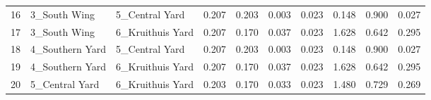 \begin{tabular}{lllrrrrrrr}
16 &     3\_South Wing &    5\_Central Yard &    0.207 &    0.203 &  0.003 &  0.023 &  0.148 &    0.900 &   0.027 \\
17 &     3\_South Wing &  6\_Kruithuis Yard &    0.207 &    0.170 &  0.037 &  0.023 &  1.628 &    0.642 &   0.295 \\
18 &  4\_Southern Yard &    5\_Central Yard &    0.207 &    0.203 &  0.003 &  0.023 &  0.148 &    0.900 &   0.027 \\
19 &  4\_Southern Yard &  6\_Kruithuis Yard &    0.207 &    0.170 &  0.037 &  0.023 &  1.628 &    0.642 &   0.295 \\
20 &   5\_Central Yard &  6\_Kruithuis Yard &    0.203 &    0.170 &  0.033 &  0.023 &  1.480 &    0.729 &   0.269 \\
\bottomrule
\end{tabular}
